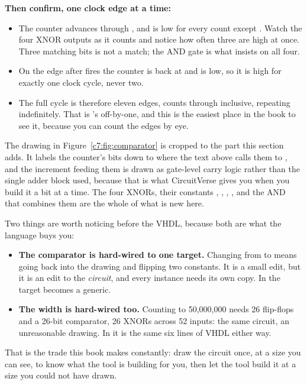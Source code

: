 \textbf{Then confirm, one clock edge at a time:}
\begin{itemize}
  \item The counter advances  through , and  is low for every
    count except . Watch the four XNOR outputs as it counts and notice how often three
    are high at once. Three matching bits is not a match; the AND gate is what insists on all four.
  \item On the edge after  fires the counter is back at  and
     is low, so it is high for exactly one clock cycle, never two.
  \item The full cycle is therefore eleven edges, counts  through  inclusive,
    repeating indefinitely. That is 's  off-by-one, and this is
    the easiest place in the book to see it, because you can count the edges by eye.
\end{itemize}


\noindent The drawing in Figure~\ref{c7:fig:comparator} is cropped to the part this section adds.
It labels the counter's bits  down to  where the text above calls
them  to , and the increment feeding them is drawn as gate-level carry logic
rather than the single adder block  used, because that is what CircuitVerse gives
you when you build it a bit at a time. The four XNORs, their constants , ,
, , and the AND that combines them are the whole of what is new here.

Two things are worth noticing before the VHDL, because both are what the language buys you:
\begin{itemize}
  \item \textbf{The comparator is hard-wired to one target.} Changing  from
     to  means going back into the drawing and flipping two constants. It is a
    small edit, but it is an edit to the \emph{circuit}, and every instance needs its own copy. In
     the target becomes a generic.
  \item \textbf{The width is hard-wired too.} Counting to 50,000,000 needs 26 flip-flops and a
    26-bit comparator, 26 XNORs across 52 inputs: the same circuit, an unreasonable drawing. In
     it is the same six lines of VHDL either way.
\end{itemize}
That is the trade this book makes constantly: draw the circuit once, at a size you can see, to
know what the tool is building for you, then let the tool build it at a size you could not have
drawn.

